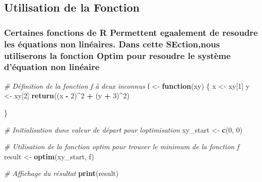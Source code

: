 \documentclass[
]{article}
\newenvironment{Shaded}{\begin{snugshade}}{\end{snugshade}}
\newcommand{\CommentTok}[1]{\textcolor[rgb]{0.56,0.35,0.01}{\textit{#1}}}
\newcommand{\ControlFlowTok}[1]{\textcolor[rgb]{0.13,0.29,0.53}{\textbf{#1}}}
\newcommand{\DecValTok}[1]{\textcolor[rgb]{0.00,0.00,0.81}{#1}}
\newcommand{\FunctionTok}[1]{\textcolor[rgb]{0.13,0.29,0.53}{\textbf{#1}}}
\newcommand{\NormalTok}[1]{#1}
\newcommand{\OtherTok}[1]{\textcolor[rgb]{0.56,0.35,0.01}{#1}}
\newcommand{\SpecialCharTok}[1]{\textcolor[rgb]{0.81,0.36,0.00}{\textbf{#1}}}
\begin{document}
\hypertarget{utilisation-de-la-fonction}{%
\subsection{Utilisation de la
Fonction}\label{utilisation-de-la-fonction}}

\hypertarget{certaines-fonctions-de-r-permettent-egaalement-de-resoudre-les-uxe9quations-non-linuxe9aires.-dans-cette-sectionnous-utiliserons-la-fonction-optim-pour-resoudre-le-systuxe8me-duxe9quation-non-linuxe9aire}{%
\subsubsection{Certaines fonctions de R Permettent egaalement de
resoudre les équations non linéaires. Dans cette SEction,nous
utiliserons la fonction Optim pour resoudre le système d'équation non
linéaire}\label{certaines-fonctions-de-r-permettent-egaalement-de-resoudre-les-uxe9quations-non-linuxe9aires.-dans-cette-sectionnous-utiliserons-la-fonction-optim-pour-resoudre-le-systuxe8me-duxe9quation-non-linuxe9aire}}

\begin{Shaded}
\begin{Highlighting}[]
\CommentTok{\# Définition de la fonction f à deux inconnus}
\NormalTok{f }\OtherTok{\textless{}{-}} \ControlFlowTok{function}\NormalTok{(xy) \{}
\NormalTok{  x }\OtherTok{\textless{}{-}}\NormalTok{ xy[}\DecValTok{1}\NormalTok{]}
\NormalTok{  y }\OtherTok{\textless{}{-}}\NormalTok{ xy[}\DecValTok{2}\NormalTok{]}
  \FunctionTok{return}\NormalTok{((x }\SpecialCharTok{{-}} \DecValTok{2}\NormalTok{)}\SpecialCharTok{\^{}}\DecValTok{2} \SpecialCharTok{+}\NormalTok{ (y }\SpecialCharTok{+} \DecValTok{3}\NormalTok{)}\SpecialCharTok{\^{}}\DecValTok{2}\NormalTok{)}
  
\NormalTok{\}}

\CommentTok{\# Initialisation d\textquotesingle{}une valeur de départ pour l\textquotesingle{}optimisation}
\NormalTok{xy\_start }\OtherTok{\textless{}{-}} \FunctionTok{c}\NormalTok{(}\DecValTok{0}\NormalTok{, }\DecValTok{0}\NormalTok{)}

\CommentTok{\# Utilisation de la fonction optim pour trouver le minimum de la fonction f}
\NormalTok{result }\OtherTok{\textless{}{-}} \FunctionTok{optim}\NormalTok{(xy\_start, f)}

\CommentTok{\# Affichage du résultat}
\FunctionTok{print}\NormalTok{(result)}
\end{Highlighting}
\end{Shaded}
\end{document}
